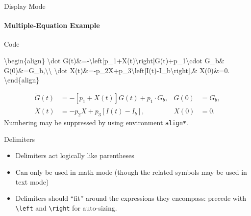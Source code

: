 \documentclass{beamer}
\begin{document}
\begin{frame}[fragile]{Display Mode}
\framesubtitle{Multiple-Equation Example}
	\begin{exampleblock}{Code}
		\begin{semiverbatim}
			\textbackslash begin\{align\}
				\textbackslash{}dot G(t)\&=-\textbackslash{}left[p\_1+X(t)\textbackslash{}right]G(t)+p\_1\textbackslash{}cdot G\_b\&
				    G(0)\&=G\_b,\textbackslash\textbackslash
				\textbackslash{}dot X(t)\&=-p\_2X+p\_3\textbackslash{}left[I(t)-I\_b\textbackslash{}right],\&
				    X(0)\&=0.
			\textbackslash end\{align\}
		\end{semiverbatim}
	\end{exampleblock}
	
	\begin{align}
		\dot G(t)&=-\left[p_1+X(t)\right]G(t)+p_1\cdot G_b,&
			G(0)&=G_b,\\
		\dot X(t)&=-p_2X+p_3\left[I(t)-I_b\right],&
			X(0)&=0.
	\end{align}
	Numbering may be suppressed by using environment \texttt{align*}.
\end{frame}

\begin{frame}{Delimiters}
	\begin{itemize}
		\item Delimiters act logically like parentheses
		\item Can only be used in math mode (though the related symbols may be used in text mode)
		\item Delimiters should ``fit'' around the expressions they encompass: precede with \texttt{\textbackslash left} and \texttt{\textbackslash right} for auto-sizing.
	\end{itemize}\vspace{-0.5cm}
\end{frame}
\end{document}
